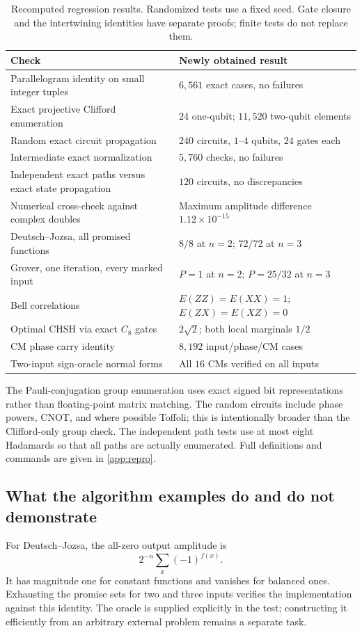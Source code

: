 \begin{table}[htbp]
\centering\small
\begin{tabularx}{\textwidth}{@{}Y L{0.38\textwidth}@{}}
\toprule
Check & Newly obtained result\\
\midrule
Parallelogram identity on small integer tuples & $6{,}561$ exact cases, no failures\\
Exact projective Clifford enumeration & $24$ one-qubit; $11{,}520$ two-qubit elements\\
Random exact circuit propagation & $240$ circuits, $1$--$4$ qubits, $24$ gates each\\
Intermediate exact normalization & $5{,}760$ checks, no failures\\
Independent exact paths versus exact state propagation & $120$ circuits, no discrepancies\\
Numerical cross-check against complex doubles & Maximum amplitude difference $1.12\times10^{-15}$\\
Deutsch--Jozsa, all promised functions & $8/8$ at $n=2$; $72/72$ at $n=3$\\
Grover, one iteration, every marked input & $P=1$ at $n=2$; $P=25/32$ at $n=3$\\
Bell correlations & $E(ZZ)=E(XX)=1$; $E(ZX)=E(XZ)=0$\\
Optimal CHSH via exact $C_8$ gates & $2\sqrt2$; both local marginals $1/2$\\
CM phase carry identity & $8{,}192$ input/phase/CM cases\\
Two-input sign-oracle normal forms & All $16$ CMs verified on all inputs\\
\bottomrule
\end{tabularx}
\caption{Recomputed regression results. Randomized tests use a fixed seed. Gate closure and the intertwining identities have separate proofs; finite tests do not replace them.}
\label{tab:quantum}
\end{table}

The Pauli-conjugation group enumeration uses exact signed bit representations rather than floating-point matrix matching. The random circuits include phase powers, CNOT, and where possible Toffoli; this is intentionally broader than the Clifford-only group check. The independent path tests use at most eight Hadamards so that all paths are actually enumerated. Full definitions and commands are given in \cref{app:repro}.

\subsection{What the algorithm examples do and do not demonstrate}
For Deutsch--Jozsa, the all-zero output amplitude is
\begin{equation}
 2^{-n}\sum_x(-1)^{f(x)}.
\end{equation}
It has magnitude one for constant functions and vanishes for balanced ones. Exhausting the promise sets for two and three inputs verifies the implementation against this identity. The oracle is supplied explicitly in the test; constructing it efficiently from an arbitrary external problem remains a separate task.

